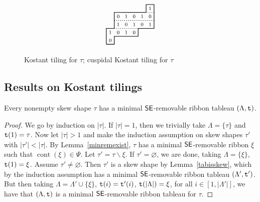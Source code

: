 \documentclass[Unicode,ALCO]{cedram}
\newcommand{\0}{{\bar 0}}
\newcommand{\ttt}{{\tt t}}
\newcommand{\ssee}{{\sf SE}}
\def\cont{{\operatorname{cont}}}
\begin{document}
\begin{figure}
\begin{align*}
{\begin{tikzpicture}[scale=0.4]
\draw[thick, dotted] (0,1)--(6,1);
\draw[thick, dotted] (1,2)--(6,2);
\draw[thick, dotted] (2,3)--(6,3);
\draw[thick]   (0,-1)--(1,-1)--(1,0)--(4,0)--(4,1)--(6,1)--(6,4)--(5,4)--(5,3)--(1,3)--(1,2)--(1,1)--(0,1)--(0,-1);
\node at (0.5,-0.5){$\scriptstyle0 $};
\node at (0.5,0.5){$\scriptstyle1 $};
\node at (1.5,0.5){$\scriptstyle0 $};
\node at (2.5,0.5){$\scriptstyle1 $};
\node at (3.5,0.5){$\scriptstyle0 $};
\node at (1.5,1.5){$\scriptstyle1 $};
\node at (2.5,1.5){$\scriptstyle0 $};
\node at (3.5,1.5){$\scriptstyle1 $};
\node at (4.5,1.5){$\scriptstyle0 $};
\node at (5.5,1.5){$\scriptstyle1 $};
\node at (1.5,2.5){$\scriptstyle0 $};
\node at (2.5,2.5){$\scriptstyle1 $};
\node at (3.5,2.5){$\scriptstyle0 $};
\node at (4.5,2.5){$\scriptstyle1 $};
\node at (5.5,2.5){$\scriptstyle0 $};
\node at (5.5,3.5){$\scriptstyle1 $};
\end{tikzpicture}
}
\end{align*}
\caption{Kostant tiling for \(\tau\); cuspidal Kostant tiling for \(\tau\)}
\label{fig:Kosex1}      
\end{figure}


\subsection{Results on Kostant tilings}\label{resKos}

\begin{lemma}\label{minremtab}
Every nonempty skew shape \(\tau\) has a minimal \(\ssee\)-removable ribbon tableau \((\Lambda,\ttt)\).
\end{lemma}
\begin{proof}
We go by induction on \(|\tau|\). If \(|\tau| = 1\), then we trivially take \(\Lambda = \{\tau\}\) and \(\ttt(1) = \tau\). Now let \(|\tau|>1\) and make the induction assumption on skew shapes \(\tau'\) with \(|\tau'| <|\tau|\).
By Lemma~\ref{minremexist}, \(\tau\) has a minimal \(\ssee\)-removable ribbon \(\xi\) such that \(\cont(\xi) \in \Psi\). Let \(\tau' = \tau \backslash \xi\). If \(\tau' = \varnothing\), we are done, taking \(\Lambda = \{\xi\}\), \(\ttt(1) = \xi\). Assume \(\tau' \neq \varnothing\). Then \(\tau'\) is a skew shape by Lemma~\ref{tabisskew}, which by the induction assumption has a minimal \(\ssee\)-removable ribbon tableau \((\Lambda', \ttt')\). But then taking \(\Lambda = \Lambda' \cup \{\xi\}\), \(\ttt(i) = \ttt'(i)\), \(\ttt(|\Lambda|) = \xi\), for all \(i \in [1,|\Lambda'|]\), we have that \((\Lambda, \ttt)\) is a minimal \(\ssee\)-removable ribbon tableau for \(\tau\).
\end{proof}
\end{document}
